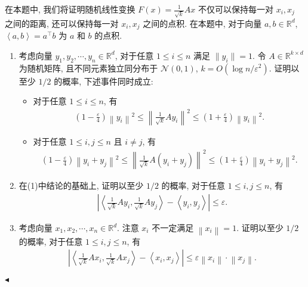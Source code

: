 \documentclass[11pt]{article}
\newenvironment{problem}[2][Problem]{\begin{trivlist}
    \item[\hskip \labelsep {\bfseries #1}\hskip \labelsep {\bfseries #2.}]\songti}{\hfill$\blacktriangleleft$\end{trivlist}}
\newcommand\1{\mathds{1}}
\newcommand\R{\mathbb{R}}
\begin{document}
\begin{problem}{5}
    在本题中, 我们将证明随机线性变换 $F(x) = \frac{1}{\sqrt{k}} Ax$ 不仅可以保持每一对 $x_i, x_j$ 之间的距离, 
    还可以保持每一对 $x_i, x_j$ 之间的点积. 在本题中, 对于向量 $a,b\in \R^d$, $\left\langle a,b\right\rangle = a^\top b$ 为 $a$ 和 $b$ 的点积. 
    \begin{enumerate}[label=(\arabic*)]
        \item 考虑向量 $y_1, y_2, \cdots, y_n \in \R^d$, 对于任意 $1\le i\le n$ 满足 $\|y_i\| = 1$. 令 $A \in \R^{k\times d}$ 为随机矩阵, 且不同元素独立同分布于 $\mathcal{N}(0,1)$, 
        $k = O(\log n/\varepsilon^2)$. 证明以至少 $1/2$ 的概率, 下述事件同时成立:
        \begin{itemize}
            \item 对于任意 $1\le i \le n$, 有
            \begin{align}
                \left(1-\frac{\varepsilon}{4}\right) \left\| y_i \right\|^2 \le  \left\| \frac{1}{\sqrt{k}} A y_i \right\|^2 \le \left(1+\frac{\varepsilon}{4}\right) \left\| y_i \right\|^2.
                \label{eq:5.1}
            \end{align}
            \item 对于任意 $1\le i,j \le n$ 且 $i\neq j$, 有
            \begin{align}
                \left(1 - \frac{\varepsilon}{4}\right) \left\| y_i + y_j \right\|^2 \le \left\| \frac{1}{\sqrt{k}} A(y_i + y_j) \right\|^2 \le \left(1 + \frac{\varepsilon}{4}\right) \left\| y_i + y_j \right\|^2.
                \label{eq:5.2}
            \end{align}
        \end{itemize}
        \item 在(1)中结论的基础上, 证明以至少 $1/2$ 的概率, 对于任意 $1\le i,j \le n$, 有
        \begin{align*}
            \left|\left\langle \frac{1}{\sqrt{k}}Ay_i, \frac{1}{\sqrt{k}}Ay_j \right\rangle - \left\langle y_i, y_j \right\rangle\right| \le \varepsilon.
        \end{align*}
        \item 考虑向量 $x_1, x_2, \cdots, x_n \in \R^d$. 注意 $x_i$ 不一定满足 $\left\| x_i \right\| = 1$. 证明以至少 $1/2$ 的概率, 对于任意 $1\le i,j \le n$, 有
        \begin{align*}
            \left|\left\langle \frac{1}{\sqrt{k}}Ax_i, \frac{1}{\sqrt{k}}Ax_j\right\rangle - \left\langle x_i, x_j \right\rangle\right| \le \varepsilon \left\| x_i \right\| \cdot \left\|x_j\right\|.
        \end{align*}
    \end{enumerate}
\end{problem}
\end{document}
